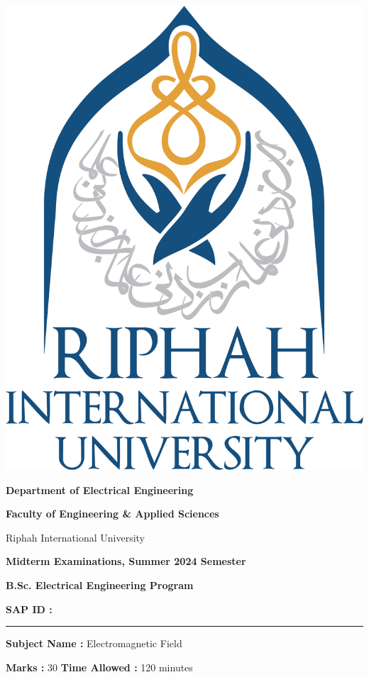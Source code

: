 	\noindent
	\begin{minipage}[l]{0.1\textwidth}
		\noindent
		\includegraphics[width=1.5\textwidth]{RIU logo.png}
	\end{minipage}
	\hfill
	\begin{minipage}[c]{1\textwidth}
		\begin{center}
			\large	\textbf{Department of Electrical Engineering} \par
			\large	\textbf{Faculty of Engineering \& Applied Sciences		}	\par
		    Riphah International University	\par
		    \textbf{Midterm Examinations, Summer 2024 Semester} \par 
		    \textbf{\small B.Sc. Electrical Engineering Program} 
		\end{center}
	\end{minipage}
\par
	\vspace{0.2in}

	\noindent
	\textbf{SAP ID :} \hspace{0.5in} \rule{3cm}{0.15mm} \hspace{0.43in}  \textbf{Subject Name :} \hspace{0.5in} Electromagnetic Field \par
	\vspace{0.2in}
	\noindent
	\textbf{Marks :} \hspace{1in} 30 \hspace{1in} \textbf{Time Allowed :} \hspace{0.5in} 120 minutes \par
